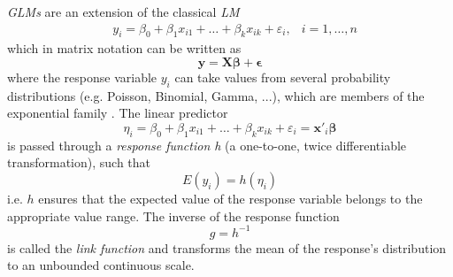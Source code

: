 \textit{\acp{GLM}} are an extension of the classical \textit{\ac{LM}}
$$
\begin{aligned}
&y_{i}=\beta_{0}+\beta_{1} x_{i 1}+\ldots+\beta_{k} x_{i k}+\varepsilon_{i}, &i=1, \ldots, n
\end{aligned}
$$
which in matrix notation can be written as
$$ \bm{y} = \bm{X}\bm{\beta} + \bm{\epsilon} $$
where the response variable $y_i$ can take values from several probability distributions (e.g. Poisson, Binomial, Gamma, ...), which are members of the exponential family \citep{fahrmeir2003regression}. The linear predictor 
\begin{equation} 
\eta_i = \beta_{0}+\beta_{1} x_{i 1}+\ldots+\beta_{k} x_{i k}+\varepsilon_{i} = \bm{x'}_i \bm{\beta}
\label{eq:linear_predictor_glm}
\end{equation}
is passed through a \textit{response function h} (a one-to-one, twice differentiable transformation), such that
\begin{equation}
 E(y_i) = h(\eta_i) 
\label{eq:response_function}
\end{equation}
i.e. $h$ ensures that the expected value of the response variable belongs to the appropriate value range. The inverse of the response function
\begin{equation}
g = h^{-1}
\label{eq:link_function}
\end{equation} 
is called the \textit{link function} and transforms the mean of the response's distribution to an unbounded continuous scale.




